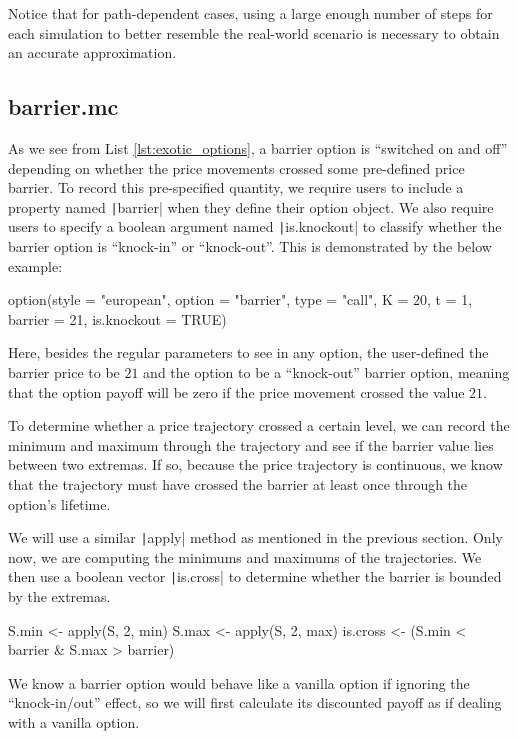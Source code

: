 Notice that for path-dependent cases, using a large enough number of steps for each simulation to better resemble the real-world scenario is necessary to obtain an accurate approximation.

\subsection{barrier.mc}

As we see from List \ref{lst:exotic_options}, a barrier option is ``switched on and off'' depending on whether the price movements crossed some pre-defined price barrier. To record this pre-specified quantity, we require users to include a property named \texttt|barrier| when they define their option object. We also require users to specify a boolean argument named \texttt|is.knockout| to classify whether the barrier option is ``knock-in'' or ``knock-out''. This is demonstrated by the below example:

\begin{Rminted}
option(style = "european", option = "barrier", type = "call", K = 20, t = 1, barrier = 21, is.knockout = TRUE)
\end{Rminted}

Here, besides the regular parameters to see in any option, the user-defined the barrier price to be $21$ and the option to be a ``knock-out'' barrier option, meaning that the option payoff will be zero if the price movement crossed the value $21$.

To determine whether a price trajectory crossed a certain level, we can record the minimum and maximum through the trajectory and see if the barrier value lies between two extremas. If so, because the price trajectory is continuous, we know that the trajectory must have crossed the barrier at least once through the option's lifetime.

We will use a similar \texttt|apply| method as mentioned in the previous section. Only now, we are computing the minimums and maximums of the trajectories. We then use a boolean vector \texttt|is.cross| to determine whether the barrier is bounded by the extremas.

\begin{Rminted}
S.min <- apply(S, 2, min)
S.max <- apply(S, 2, max)
is.cross <- (S.min < barrier & S.max > barrier)
\end{Rminted}

We know a barrier option would behave like a vanilla option if ignoring the ``knock-in/out'' effect, so we will first calculate its discounted payoff as if dealing with a vanilla option.

